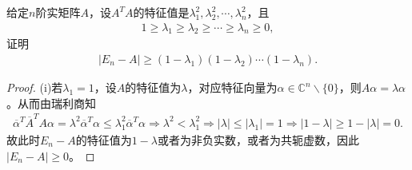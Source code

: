 \documentclass[../../main.tex]{subfiles}%
\begin{document}
\begin{example}
给定$n$阶实矩阵$A$，设$A^T A$的特征值是$\lambda_1^2,\lambda_2^2,\cdots,\lambda_n^2$，且
\begin{align*}
1 \geqslant \lambda_1 \geqslant \lambda_2 \geqslant \cdots \geqslant \lambda_n \geqslant 0,
\end{align*}
证明
\begin{align*}
|E_n - A| \geqslant (1 - \lambda_1)(1 - \lambda_2)\cdots(1 - \lambda_n).
\end{align*}
\end{example}
\begin{proof}
(i)若$\lambda_1=1$，设$A$的特征值为$\lambda$，对应特征向量为$\alpha \in \mathbb{C}^n\backslash \{0\}$，则$A\alpha=\lambda \alpha$。从而由瑞利商知
\begin{align*}
\overline{\alpha}^T\overline{A}^TA\alpha=\lambda^2\overline{\alpha}^T\alpha \leqslant \lambda_1^2\overline{\alpha}^T\alpha \Longrightarrow \lambda^2<\lambda_1^2
\Longrightarrow |\lambda| \leqslant |\lambda_1|=1 \Longrightarrow |1-\lambda| \geqslant 1-|\lambda|=0.
\end{align*}
故此时$E_n-A$的特征值为$1-\lambda$或者为非负实数，或者为共轭虚数，因此$|E_n-A| \geqslant 0$。


\end{proof}
\end{document}
